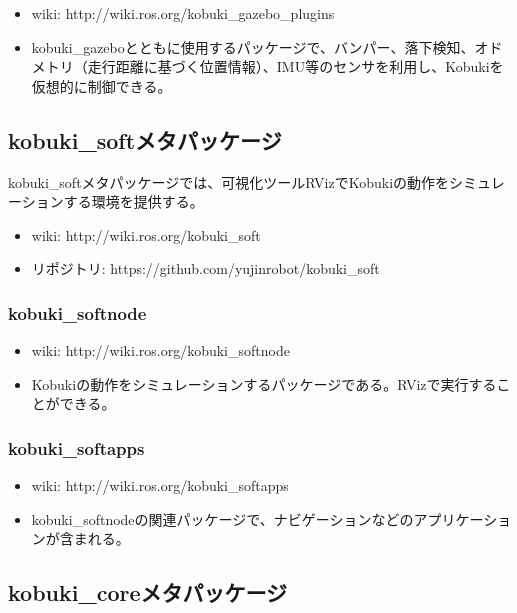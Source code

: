\begin{itemize}
\begin{itemize}
\item wiki: http://wiki.ros.org/kobuki\_gazebo\_plugins
\item kobuki\_gazeboとともに使用するパッケージで、バンパー、落下検知、オドメトリ（走行距離に基づく位置情報）、IMU等のセンサを利用し、Kobukiを仮想的に制御できる。
\end{itemize}

\subsection{kobuki\_softメタパッケージ}

kobuki\_softメタパッケージでは、可視化ツールRVizでKobukiの動作をシミュレーションする環境を提供する。

\begin{itemize}
\item wiki: http://wiki.ros.org/kobuki\_soft
\item リポジトリ: https://github.com/yujinrobot/kobuki\_soft
\end{itemize}

\subsubsection{kobuki\_softnode}

\begin{itemize}
\item wiki: http://wiki.ros.org/kobuki\_softnode
\item Kobukiの動作をシミュレーションするパッケージである。RVizで実行することができる。
\end{itemize}

\subsubsection{kobuki\_softapps}

\begin{itemize}
\item wiki: http://wiki.ros.org/kobuki\_softapps
\item kobuki\_softnodeの関連パッケージで、ナビゲーションなどのアプリケーションが含まれる。
\end{itemize}

\subsection{kobuki\_coreメタパッケージ}


\end{itemize}
